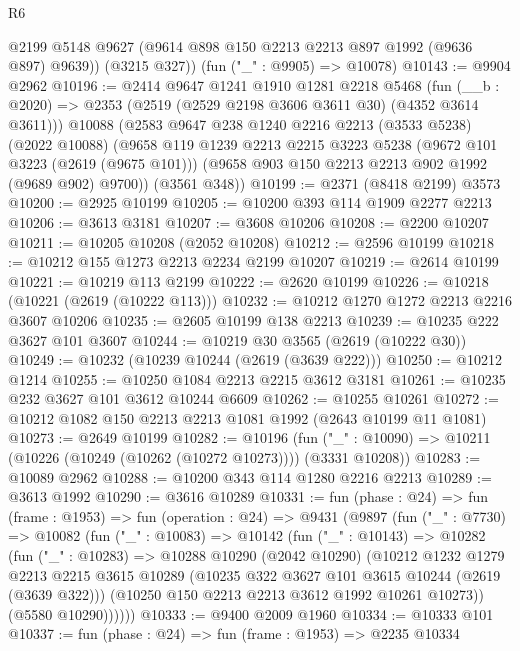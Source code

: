 \begin{lexlean}{R6}
\begin{coremodule}
        @2199
        @5148
        @9627
        (@9614 @898 @150 @2213 @2213 @897 @1992 (@9636 @897) @9639))
      (@3215 @327))
    (fun ("_" : @9905) => @10078)
@10143 := @9904 @2962
@10196 := @2414
    @9647
    @1241
    @1910
    @1281
    @2218
    @5468
    (fun (__b : @2020) => @2353 (@2519 (@2529 @2198 @3606 @3611 @30) (@4352 @3614 @3611)))
    @10088
    (@2583
      @9647
      @238
      @1240
      @2216
      @2213
      (@3533 @5238)
      (@2022 @10088)
      (@9658
        @119
        @1239
        @2213
        @2215
        @3223
        @5238
        (@9672 @101 @3223 (@2619 (@9675 @101)))
        (@9658 @903 @150 @2213 @2213 @902 @1992 (@9689 @902) @9700))
      (@3561 @348))
@10199 := @2371 (@8418 @2199) @3573
@10200 := @2925 @10199
@10205 := @10200 @393 @114 @1909 @2277 @2213
@10206 := @3613 @3181
@10207 := @3608 @10206
@10208 := @2200 @10207
@10211 := @10205 @10208 (@2052 @10208)
@10212 := @2596 @10199
@10218 := @10212 @155 @1273 @2213 @2234 @2199 @10207
@10219 := @2614 @10199
@10221 := @10219 @113 @2199
@10222 := @2620 @10199
@10226 := @10218 (@10221 (@2619 (@10222 @113)))
@10232 := @10212 @1270 @1272 @2213 @2216 @3607 @10206
@10235 := @2605 @10199 @138 @2213
@10239 := @10235 @222 @3627 @101 @3607
@10244 := @10219 @30 @3565 (@2619 (@10222 @30))
@10249 := @10232 (@10239 @10244 (@2619 (@3639 @222)))
@10250 := @10212 @1214
@10255 := @10250 @1084 @2213 @2215 @3612 @3181
@10261 := @10235 @232 @3627 @101 @3612 @10244 @6609
@10262 := @10255 @10261
@10272 := @10212 @1082 @150 @2213 @2213 @1081 @1992 (@2643 @10199 @11 @1081)
@10273 := @2649 @10199
@10282 := @10196
    (fun ("_" : @10090) => @10211 (@10226 (@10249 (@10262 (@10272 @10273)))) (@3331 @10208))
@10283 := @10089 @2962
@10288 := @10200 @343 @114 @1280 @2216 @2213
@10289 := @3613 @1992
@10290 := @3616 @10289
@10331 := fun (phase : @24) =>
  fun (frame : @1953) =>
  fun (operation : @24) =>
  @9431
    (@9897
      (fun ("_" : @7730) =>
      @10082
        (fun ("_" : @10083) =>
        @10142
          (fun ("_" : @10143) =>
          @10282
            (fun ("_" : @10283) =>
            @10288
              @10290
              (@2042 @10290)
              (@10212
                @1232
                @1279
                @2213
                @2215
                @3615
                @10289
                (@10235 @322 @3627 @101 @3615 @10244 (@2619 (@3639 @322)))
                (@10250 @150 @2213 @2213 @3612 @1992 @10261 @10273))
              (@5580 @10290))))))
@10333 := @9400 @2009 @1960
@10334 := @10333 @101
@10337 := fun (phase : @24) => fun (frame : @1953) => @2235 @10334

\end{coremodule}
\end{lexlean}
